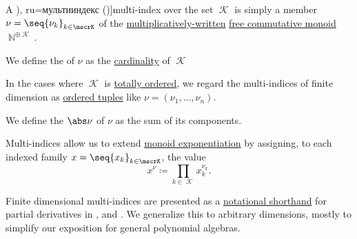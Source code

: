 \begin{definition}\label{def:multi_index}\mimprovised
  A \term[en=multi-index (\cite[236]{Folland1999RealAnalysis}), ru=мультииндекс (\cite[42]{Тыртышников2017ОсновыАлгебры})]{multi-index} over the set \( \mscrK \) is simply a member \( \nu = \seq{ \nu_k }_{k \in \mscrK} \) of the \hyperref[def:additive_semigroup]{multiplicatively-written} \hyperref[def:free_commutative_monoid]{free commutative monoid} \( \BbbN^{\oplus \mscrK} \).

  \begin{thmenum}
     We define the  of \( \nu \) as the \hyperref[def:cardinality]{cardinality} of \( \mscrK \)

    In the cases where \( \mscrK \) is \hyperref[def:totally_ordered_set]{totally ordered}, we regard the multi-indices of finite dimension as \hyperref[def:ordered_tuple]{ordered tuples} like \( \nu = (\nu_1, \ldots, \nu_n) \).

     We define the  \( \abs\nu \) of \( \nu \) as the sum of its components.

     Multi-indices allow us to extend \hyperref[def:monoid/exponentiation]{monoid exponentiation} by assigning, to each indexed family \( x = \seq{ x_k }_{k \in \mscrK} \), the value
    \begin{equation*}
      x^\nu \coloneqq \prod_{k \in \mscrK} x_k^{\nu_k}.
    \end{equation*}
  \end{thmenum}
\end{definition}
\begin{comments}
  \item Finite dimensional multi-indices are presented as a \hyperref[con:syntactic_abbreviation]{notational shorthand} for partial derivatives in \cite[236]{Folland1999RealAnalysis}, \cite[30]{AtkinsonHan2001TheoreticalNumericalAnalysis} and \cite[438]{Зорич2019АнализЧасть1}. We generalize this to arbitrary dimensions, mostly to simplify our exposition for general polynomial algebras.
\end{comments}

